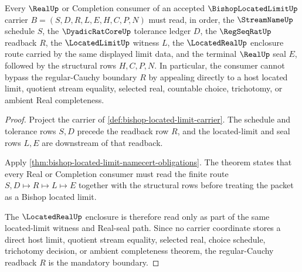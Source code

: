 \begin{theorem}
\label{thm:bishop-located-limit-regular-cauchy-readback}
Every $\RealUp$ or Completion consumer of an accepted $\BishopLocatedLimitUp$ carrier $B=(S,D,R,L,E,H,C,P,N)$ must read, in order, the $\StreamNameUp$ schedule $S$, the $\DyadicRatCoreUp$ tolerance ledger $D$, the $\RegSeqRatUp$ readback $R$, the $\LocatedLimitUp$ witness $L$, the $\LocatedRealUp$ enclosure route carried by the same displayed limit data, and the terminal $\RealUp$ seal $E$, followed by the structural rows $H,C,P,N$. In particular, the consumer cannot bypass the regular-Cauchy boundary $R$ by appealing directly to a host located limit, quotient stream equality, selected real, countable choice, trichotomy, or ambient Real completeness.
\end{theorem}
\begin{proof}
Project the carrier of \autoref{def:bishop-located-limit-carrier}. The schedule and tolerance rows $S,D$ precede the readback row $R$, and the located-limit and seal rows $L,E$ are downstream of that readback.

Apply \autoref{thm:bishop-located-limit-namecert-obligations}. The theorem states that every Real or Completion consumer must read the finite route $S,D \longmapsto R \longmapsto L \longmapsto E$ together with the structural rows before treating the packet as a Bishop located limit.

The $\LocatedRealUp$ enclosure is therefore read only as part of the same located-limit witness and Real-seal path. Since no carrier coordinate stores a direct host limit, quotient stream equality, selected real, choice schedule, trichotomy decision, or ambient completeness theorem, the regular-Cauchy readback $R$ is the mandatory boundary.
\end{proof}

